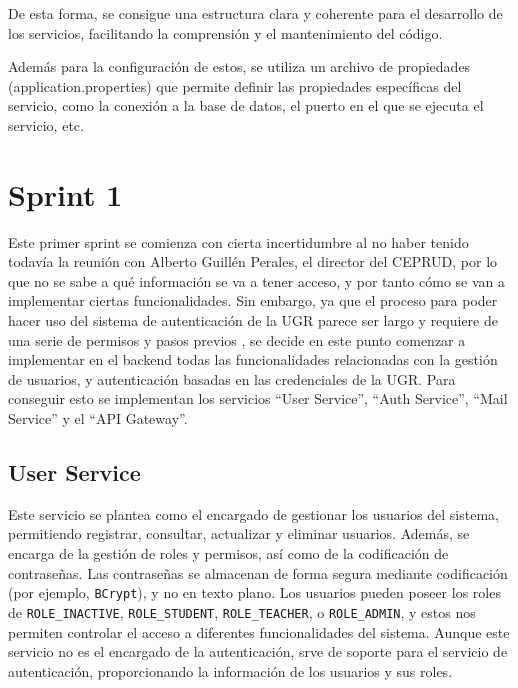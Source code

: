 De esta forma, se consigue una estructura clara y coherente para el desarrollo de los servicios, facilitando la comprensión y el mantenimiento del código.

Además para la configuración de estos, se utiliza un archivo de propiedades (application.properties) que permite definir las propiedades específicas del servicio, como la conexión a la base de datos, el puerto en el que se ejecuta el servicio, etc.

\section{Sprint 1}

Este primer sprint se comienza con cierta incertidumbre al no haber tenido todavía la reunión con Alberto Guillén Perales, el director del CEPRUD, por lo que no se sabe a qué información se va a tener acceso, y por tanto cómo se van a implementar ciertas funcionalidades.
\newline\newline
Sin embargo, ya que el proceso para poder hacer uso del sistema de autenticación de la UGR parece ser largo y requiere de una serie de permisos y pasos previos \cite{autenticacion_ugr}, se decide en este punto comenzar a implementar en el backend todas las funcionalidades relacionadas con la gestión de usuarios, y autenticación basadas en las credenciales de la UGR.
\newline\newline
Para conseguir esto se implementan los servicios ``User Service'', ``Auth Service'', ``Mail Service'' y el ``API Gateway''.

\subsection{User Service}

Este servicio se plantea como el encargado de gestionar los usuarios del sistema, permitiendo registrar, consultar, actualizar y eliminar usuarios. Además, se encarga de la gestión de roles y permisos, así como de la codificación de contraseñas.
\newline 
Las contraseñas se almacenan de forma segura mediante codificación (por ejemplo, \texttt{BCrypt}), y no en texto plano.
\newline\newline
Los usuarios pueden poseer los roles de \texttt{ROLE\_INACTIVE}, \texttt{ROLE\_STUDENT}, \texttt{ROLE\_TEACHER}, o \texttt{ROLE\_ADMIN}, y estos nos permiten controlar el acceso a diferentes funcionalidades del sistema.
\newline\newline
Aunque este servicio no es el encargado de la autenticación, srve de soporte para el servicio de autenticación, proporcionando la información de los usuarios y sus roles.

